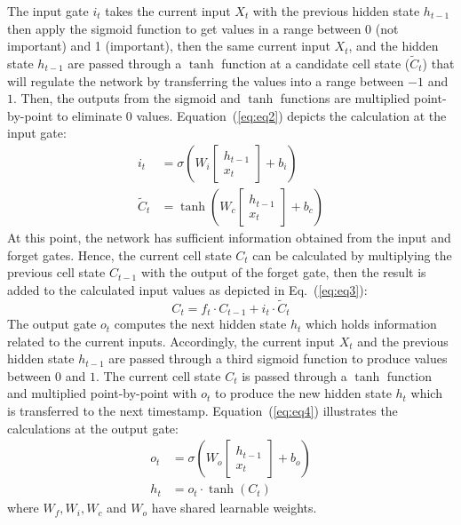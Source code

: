 The input gate \(i_{t}\) takes the current input \(X_t\) with the previous hidden state \(h_{t-1}\) then apply the sigmoid function to get values in a range between 0 (not important) and 1 (important), then the
same current input \(X_t\), and the hidden state \(h_{t-1}\) are passed through a \(\tanh\) function at a candidate cell state (\(\tilde{C}_{t}\)) that will regulate the network by transferring the values into a range between \(-1\) and \(1\).
Then, the outputs from the sigmoid and \(\tanh\) functions are multiplied point-by-point to eliminate \(0\) values.  
Equation~(\ref{eq:eq2}) depicts the calculation at the input gate:
\begin{equation}
	\begin{aligned}
		i_{t} &=\sigma\left(W_{i} 
		\left[
		\begin{array}{c}
			h_{t-1} \\ x_{t}
		\end{array} 
		\right]+b_{i}\right) 
		\\
		\tilde{C}_{t} &=\tanh \left(W_{c} 
		\left[
		\begin{array}{c}
			h_{t-1} \\ x_{t}
		\end{array} 
		\right]+b_{c}\right) 
	\end{aligned} \label{eq:eq2}
\end{equation}
At this point, the network has sufficient information obtained from the input and forget gates. 
Hence, the current cell state \(C_t\) can be calculated by multiplying the previous cell state \(C_{t-1}\) with the output of the forget gate, then the result is added to the calculated input values as depicted in Eq.~(\ref{eq:eq3}): 
\begin{equation}
	C_{t}=f_{t} \cdot C_{t-1}+i_{t} \cdot \tilde{C}_{t}
	\label{eq:eq3}
\end{equation}
The output gate \(o_{t}\) computes the next hidden state \(h_{t}\) which
holds information related to the current inputs. 
Accordingly, the current input \(X_{t}\) and the previous hidden state \(h_{t-1}\) are passed through a third sigmoid function to produce values between \(0\) and \(1\).
The current cell state \(C_{t}\) is passed through a \(\tanh\) function and multiplied point-by-point with \(o_{t}\) to produce the new hidden state \(h_{t}\) which is transferred to the next timestamp.
Equation~(\ref{eq:eq4}) illustrates the calculations at the output gate:
\begin{equation}
	\begin{aligned}
		o_{t} &=\sigma\left(W_{o} 
		\left[
		\begin{array}{c}
			h_{t-1} \\ x_{t}
		\end{array} 
		\right]
		+b_{o}\right) \\
		h_{t} &=o_{t} \cdot \tanh \left(C_{t}\right)
	\end{aligned}
	\label{eq:eq4}
\end{equation} 
where \(W_{f}, W_{i}, W_{c}\) and \(W_{o}\) have shared learnable weights.

